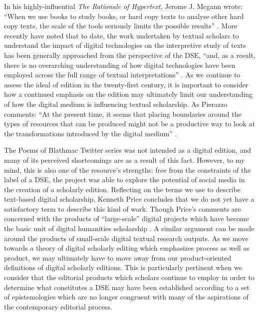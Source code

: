 \begin{paper}
In his highly-influential \textit{The Rationale of Hypertext}, Jerome J. Mcgann wrote: ``When we use books to study books, or hard copy texts to analyse other hard copy texts, the scale of the tools seriously limits the possible results'' \citep{mcgann_rationale_2001}. More recently \citeauthor{franzini_catalogue_2016} have noted that to date, the work undertaken by textual scholars to understand the impact of digital technologies on the interpretive study of texts has been generally approached from the perspective of the DSE, ``and, as a result, there is no overarching understanding of how digital technologies have been employed across the full range of textual interpretations'' \cite[161]{franzini_catalogue_2016}. As we continue to assess the ideal of edition in the twenty-first century, it is important to consider how a continued emphasis on the edition may ultimately limit our understanding of how the digital medium is influencing textual scholarship. As Pierazzo comments: ``At the present time, it seems that placing boundaries around the types of resources that can be produced might not be a productive way to look at the transformations introduced by the digital medium'' \citep[210]{pierazzo_digital_2014}.

The Poems of Blathmac Twitter series was not intended as a digital edition, and many of its perceived shortcomings are as a result of this fact. However, to my mind, this is also one of the resource’s strengths: free from the constraints of the label of a DSE, the project was able to explore the potential of social media in the creation of a scholarly edition. Reflecting on the terms we use to describe text-based digital scholarship, Kenneth Price concludes that we do not yet have a satisfactory term to describe this kind of work. Though Price’s comments are concerned with the products of ``large-scale'' digital projects which have become the basic unit of digital humanities scholarship \citep{price_edition_2009}. A similar argument can be made around the products of small-scale digital textual research outputs. As we move towards a theory of digital scholarly editing which emphasizes process as well as product, we may ultimately have to move away from our product-oriented definitions of digital scholarly editions. This is particularly pertinent when we consider that the editorial products which scholars continue to employ in order to determine what constitutes a DSE may have been established according to a set of epistemologies which are no longer congruent with many of the aspirations of the contemporary editorial process.

\begin{flushleft}

\end{flushleft}

\end{paper}